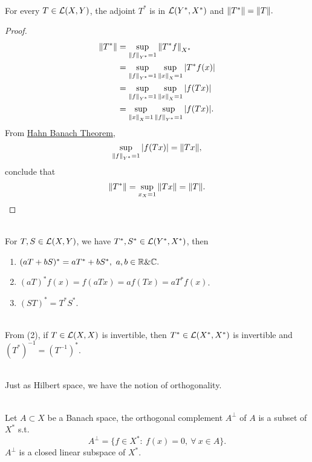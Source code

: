 \begin{proposition}\ \\
For every $T \in \mathcal{L}(X,Y)$, the adjoint $T^*$ is in $\mathcal{L}(Y^*, X^*)$ and $\norm{T^*} = \norm{T}.$
\end{proposition}
\begin{proof}\ 
\begin{align*}
    \norm{T^*} &= \sup_{\norm{f}_{Y^*} = 1} \norm{T^* f}_{X^*}\\ 
    &= \sup_{\norm{f}_{Y^*} = 1} \sup_{\norm{x}_X = 1} \abs{T^* f(x)}\\
    &= \sup_{\norm{f}_{Y^*} = 1} \sup_{\norm{x}_X = 1} \abs{f(Tx)}\\
    &=  \sup_{\norm{x}_X = 1} \sup_{\norm{f}_{Y^*} = 1}\abs{f(Tx)}.
\end{align*}
From \hyperref[HB thm]{Hahn Banach Theorem}, 
\begin{equation*}
    \sup_{\norm{f}_{Y^*} = 1} \abs{f(Tx)} = \norm{Tx},
\end{equation*}
conclude that
\begin{equation*}
    \norm{T^*} = \sup_{{x}_X = 1} \norm{Tx} = \norm{T}.
\end{equation*}
\end{proof}


\begin{proposition}\ \\
For $T,S \in \mathcal{L}(X,Y)$, we have $T^*,S^* \in \mathcal{L}(Y^*, X^*)$, then
\begin{enumerate}[label = (\arabic*)]
    \item $(aT + bS)^* = aT^* + b S^*,\ a,b \in \mathbb{R} \& \mathbb{C}.$
    \item $(a T)^* f(x) = f(a Tx) = af(Tx) = aT^* f(x)$.
    \item $(ST)^* = T^* S^*$.
\end{enumerate}
\end{proposition}
\begin{remark}\ \\
From (2), if $T \in \mathcal{L}(X,X)$ is invertible, then $T^* \in \mathcal{L}(X^*,X^*)$ is invertible and $(T^*)^{-1} = (T^{-1})^*$.
\end{remark}

\begin{remark}\ \\
Just as Hilbert space, we have the notion of orthogonality.
\end{remark}

\begin{definition}\ \\
Let $A \subset X$ be a Banach space, the orthogonal complement $A^\perp$ of $A$ is a subset of $X^*$ s.t.
\begin{equation*}
    A^\perp = \{f \in X^*:\ f(x) = 0,\ \forall\ x \in A\}.
\end{equation*}
$A^\perp$ is a closed linear subspace of $X^*$.
\end{definition}




